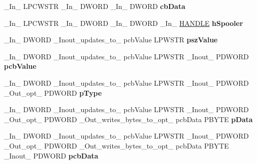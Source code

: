 \begin{DoxyCompactItemize}
\item 
\mbox{\label{struct___m_o_n_i_t_o_r_r_e_g_a5de2bd17e99c2f8ac231beba5cd64393}} 
\+\_\+\+In\+\_\+ L\+P\+C\+W\+S\+TR \+\_\+\+In\+\_\+ D\+W\+O\+RD \+\_\+\+In\+\_\+ D\+W\+O\+RD {\bfseries cb\+Data}
\item 
\mbox{\label{struct___m_o_n_i_t_o_r_r_e_g_ada6aa44e3183b17daebf6e3ee48ee823}} 
\+\_\+\+In\+\_\+ L\+P\+C\+W\+S\+TR \+\_\+\+In\+\_\+ D\+W\+O\+RD \+\_\+\+In\+\_\+ D\+W\+O\+RD \+\_\+\+In\+\_\+ \hyperlink{interfacevoid}{H\+A\+N\+D\+LE} {\bfseries h\+Spooler}
\item 
\mbox{\label{struct___m_o_n_i_t_o_r_r_e_g_a061a7c77af0b8d5c3c0e58e464d8c54e}} 
\+\_\+\+In\+\_\+ D\+W\+O\+RD \+\_\+\+Inout\+\_\+updates\+\_\+to\+\_\+ pcb\+Value L\+P\+W\+S\+TR {\bfseries psz\+Value}
\item 
\mbox{\label{struct___m_o_n_i_t_o_r_r_e_g_a6b80c95e9f82eb7ab873fe56a7f0bf8e}} 
\+\_\+\+In\+\_\+ D\+W\+O\+RD \+\_\+\+Inout\+\_\+updates\+\_\+to\+\_\+ pcb\+Value L\+P\+W\+S\+TR \+\_\+\+Inout\+\_\+ P\+D\+W\+O\+RD {\bfseries pcb\+Value}
\item 
\mbox{\label{struct___m_o_n_i_t_o_r_r_e_g_a8f4e916ea6e16cae3adf3aa5426b2411}} 
\+\_\+\+In\+\_\+ D\+W\+O\+RD \+\_\+\+Inout\+\_\+updates\+\_\+to\+\_\+ pcb\+Value L\+P\+W\+S\+TR \+\_\+\+Inout\+\_\+ P\+D\+W\+O\+RD \+\_\+\+Out\+\_\+opt\+\_\+ P\+D\+W\+O\+RD {\bfseries p\+Type}
\item 
\mbox{\label{struct___m_o_n_i_t_o_r_r_e_g_a973a4f79b2d791cf125c65898298808a}} 
\+\_\+\+In\+\_\+ D\+W\+O\+RD \+\_\+\+Inout\+\_\+updates\+\_\+to\+\_\+ pcb\+Value L\+P\+W\+S\+TR \+\_\+\+Inout\+\_\+ P\+D\+W\+O\+RD \+\_\+\+Out\+\_\+opt\+\_\+ P\+D\+W\+O\+RD \+\_\+\+Out\+\_\+writes\+\_\+bytes\+\_\+to\+\_\+opt\+\_\+ pcb\+Data P\+B\+Y\+TE {\bfseries p\+Data}
\item 
\mbox{\label{struct___m_o_n_i_t_o_r_r_e_g_afd73aa9815674360d015ab37deafa4b0}} 
\+\_\+\+In\+\_\+ D\+W\+O\+RD \+\_\+\+Inout\+\_\+updates\+\_\+to\+\_\+ pcb\+Value L\+P\+W\+S\+TR \+\_\+\+Inout\+\_\+ P\+D\+W\+O\+RD \+\_\+\+Out\+\_\+opt\+\_\+ P\+D\+W\+O\+RD \+\_\+\+Out\+\_\+writes\+\_\+bytes\+\_\+to\+\_\+opt\+\_\+ pcb\+Data P\+B\+Y\+TE \+\_\+\+Inout\+\_\+ P\+D\+W\+O\+RD {\bfseries pcb\+Data}

\end{DoxyCompactItemize}
